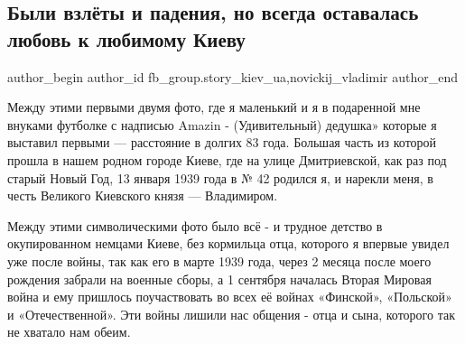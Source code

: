  
 
 
 
 
 
\subsection{Были взлёты и падения, но всегда оставалась любовь к любимому Киеву}
\label{sec:13_01_2022.fb.fb_group.story_kiev_ua.2.vzlety_i_padenia}
 
\ifcmt
 author_begin
   author_id fb_group.story_kiev_ua,novickij_vladimir
 author_end
\fi

Между этими первыми двумя фото, где я маленький и  я в подаренной мне внуками
футболке с надписью  Amazin - (Удивительный) дедушка» которые я выставил первыми
— расстояние в долгих 83 года.  Большая часть из которой прошла в нашем родном
городе Киеве, где на улице Дмитриевской, как раз под старый Новый Год, 13
января 1939 года  в № 42 родился я,  и нарекли меня, в честь Великого Киевского
князя — Владимиром. 

Между этими символическими фото  было всё - и трудное детство в окупированном
немцами Киеве, без кормильца отца, которого я впервые увидел уже после войны,
так как его в марте 1939 года, через 2 месяца после моего рождения забрали на
военные сборы, а  1 сентября началась Вторая Мировая война и ему пришлось
поучаствовать  во всех её войнах «Финской», «Польской» и «Отечественной». Эти
войны лишили нас общения - отца и сына, которого так не  хватало нам обеим.


